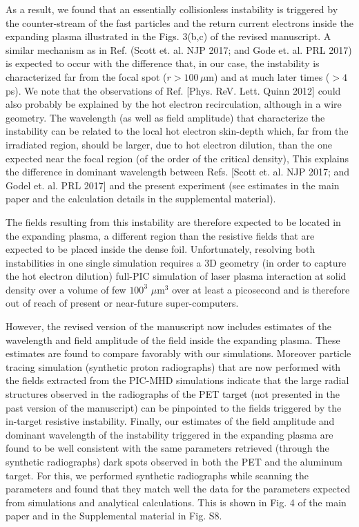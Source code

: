 \documentclass{article}
\begin{document}
\begin{enumerate}
As a result, we found that an essentially collisionless instability  is triggered by the counter-stream of the fast particles and the return current electrons  inside the expanding plasma illustrated in the Figs. 3(b,c) of the revised manuscript.
A similar mechanism as in Ref. (Scott et. al. NJP 2017; and Gode et. al. PRL 2017)   is expected to occur with the difference that, in our case,  the instability is characterized far from the focal spot ($r > 100 \, \mu$m) and at much later times ($>4$ ps).
We note that the observations of Ref. [Phys. ReV. Lett. Quinn 2012] could also probably be explained by the hot electron recirculation, although  in a wire geometry.
The wavelength (as well as field amplitude) that characterize the instability can be related to the local hot electron skin-depth which,  far from the irradiated region, should be larger, due to hot electron dilution, than the one expected near the focal region (of the order of the critical density), This explains the difference in dominant wavelength between Refs. [Scott et. al. NJP 2017; and Godel et. al. PRL 2017]  and the present experiment (see estimates in the main paper and the calculation details in the supplemental material).

The fields resulting from this instability  are therefore expected to be located in the expanding plasma, a different region than the resistive fields that are expected to be placed inside the dense foil.
Unfortunately, resolving both instabilities in one single simulation requires a  3D geometry (in order to capture the hot electron dilution) full-PIC simulation of laser plasma interaction at solid density over a volume of  few   $100^3$ $\mu$m$^3$   over at least a picosecond and is therefore out of reach of present or near-future super-computers.

However, the revised version of the manuscript now includes estimates of the wavelength and field amplitude of the field inside the expanding plasma. These estimates are found to compare favorably with our simulations.  Moreover particle tracing simulation (synthetic proton radiographs) that are now performed with the fields extracted from the PIC-MHD simulations indicate that the large radial structures observed in the radiographs of the PET target (not presented in the past version of the manuscript) can be pinpointed to the fields triggered by the in-target resistive instability.
Finally, our estimates of the field amplitude and dominant wavelength of the instability triggered in the expanding plasma are found to be well consistent with the same parameters retrieved (through the synthetic radiographs) dark spots observed in both the PET and the aluminum target. For this, we performed synthetic radiographs while scanning the parameters and found that they match well the data for the parameters expected from simulations and analytical calculations. This is shown in Fig. 4  of the main paper  and in the Supplemental material in Fig. S8.



\end{enumerate}
\end{document}
